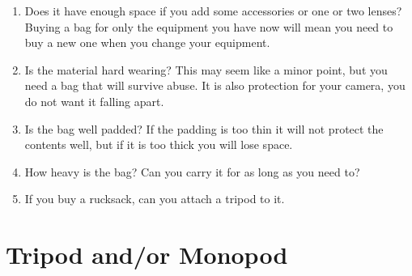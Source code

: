 \begin{enumerate}[i]
	\item Does it have enough space if you add some accessories or one or two lenses? Buying a bag for only the equipment you have now will mean you need to buy a new one when you change your equipment.
	\item Is the material hard wearing? This may seem like a minor point, but you need a bag that will survive abuse. It is also protection for your camera, you do not want it falling apart.
	\item Is the bag well padded? If the padding is too thin it will not protect the contents well, but if it is too thick you will lose space.
	\item How heavy is the bag? Can you carry it for as long as you need to?
	\item If you buy a rucksack, can you attach a tripod to it.
\end{enumerate}

\section{Tripod and/or Monopod}


